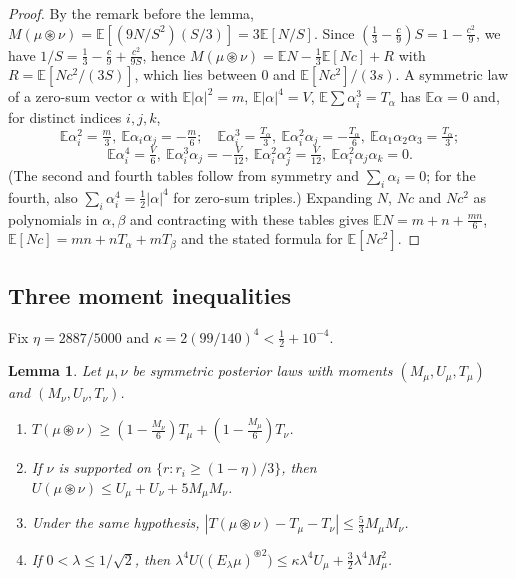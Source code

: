\documentclass[11pt]{amsart}
\newtheorem{lemma}[theorem]{Lemma}
\theoremstyle{definition}
\theoremstyle{remark}
\newcommand{\E}{\mathbb{E}}
\begin{document}
\begin{proof}
By the remark before the lemma, $M(\mu\circledast\nu)=\E[(9N/S^2)(S/3)]=3\E[N/S]$. Since
$(\tfrac13-\tfrac c9)S=1-\tfrac{c^2}9$, we have $1/S=\tfrac13-\tfrac c9+\tfrac{c^2}{9S}$, hence
$M(\mu\circledast\nu)=\E N-\tfrac13\E[Nc]+R$ with $R=\E[Nc^2/(3S)]$, which lies between $0$ and
$\E[Nc^2]/(3s)$. A symmetric law of a zero-sum vector $\alpha$ with $\E|\alpha|^2=m$,
$\E|\alpha|^4=V$, $\E\sum\alpha_i^3=T_\alpha$ has $\E\alpha=0$ and, for distinct indices $i,j,k$,
\[
\E\alpha_i^2=\tfrac m3,\ \E\alpha_i\alpha_j=-\tfrac m6;\quad
\E\alpha_i^3=\tfrac{T_\alpha}3,\ \E\alpha_i^2\alpha_j=-\tfrac{T_\alpha}6,\ \E\alpha_1\alpha_2\alpha_3=\tfrac{T_\alpha}3;
\]
\[
\E\alpha_i^4=\tfrac V6,\ \E\alpha_i^3\alpha_j=-\tfrac V{12},\ \E\alpha_i^2\alpha_j^2=\tfrac V{12},\
\E\alpha_i^2\alpha_j\alpha_k=0 .
\]
(The second and fourth tables follow from symmetry and $\sum_i\alpha_i=0$; for the fourth, also
$\sum_i\alpha_i^4=\tfrac12|\alpha|^4$ for zero-sum triples.) Expanding $N$, $Nc$ and $Nc^2$ as polynomials in
$\alpha,\beta$ and contracting with these tables gives $\E N=m+n+\tfrac{mn}6$,
$\E[Nc]=mn+nT_\alpha+mT_\beta$ and the stated formula for $\E[Nc^2]$.
\end{proof}

\subsection{Three moment inequalities}
Fix $\eta=2887/5000$ and $\kappa=2(99/140)^4<\tfrac12+10^{-4}$.

\begin{lemma}\label{lem:moments}
Let $\mu,\nu$ be symmetric posterior laws with moments $(M_\mu,U_\mu,T_\mu)$ and $(M_\nu,U_\nu,T_\nu)$.
\begin{enumerate}
\item[\textup{(CF)}] $T(\mu\circledast\nu)\ge(1-\tfrac{M_\nu}6)T_\mu+(1-\tfrac{M_\mu}6)T_\nu$.
\item[\textup{(F)}] If $\nu$ is supported on $\{r:r_i\ge(1-\eta)/3\}$, then
$U(\mu\circledast\nu)\le U_\mu+U_\nu+5M_\mu M_\nu$.
\item[\textup{(C)}] Under the same hypothesis, $|T(\mu\circledast\nu)-T_\mu-T_\nu|\le\tfrac53M_\mu M_\nu$.
\item[\textup{(F1)}] If $0<\lambda\le1/\sqrt2$, then
$\lambda^4U\big((E_\lambda\mu)^{\circledast2}\big)\le\kappa\lambda^4U_\mu+\tfrac32\lambda^4M_\mu^2$.
\end{enumerate}
\end{lemma}
\end{document}
